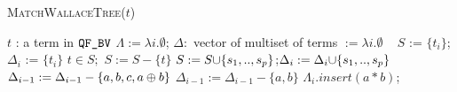 \begin{algorithm}[t]
 \caption{\textsc{MatchWallaceTree}($t$)}
 \label{alg:wallace}
 \begin{algorithmic}[1]
   \Ensure $t$ : a term in $\texttt{QF\_BV}$
   \State $\Lambda := \lambda i. \emptyset$;
   $\Delta : $ vector of multiset of terms $ := \lambda i. \emptyset$
   ~\Return{$\emptyset$}
   \State $S$ := $\{t_i\}$;$\Delta_i$ := $\{t_{i}\}$
   \State $t \in S;$ $S := S - \{t\}$
   \State $S := S {\cup} \{s_1,..,s_p\}$;$\Delta_i := \Delta_i {\cup} \{s_1,..,s_p\}$
   \State $\Delta_{i-1} := \Delta_{i-1}- \{a,b,c,a\oplus b\}$
   \State $\Delta_{i-1} := \Delta_{i-1}- \{a,b\}$
   \State $\Lambda_i.insert( a * b )$;
   \Else~\Return{$\emptyset$}
   \EndIf
   \EndFor
   ~\Return{$\emptyset$}
   \EndFor
   \State {}
   \EndIf
   \State~\Return{$\emptyset$}
 \end{algorithmic}
\end{algorithm}  



